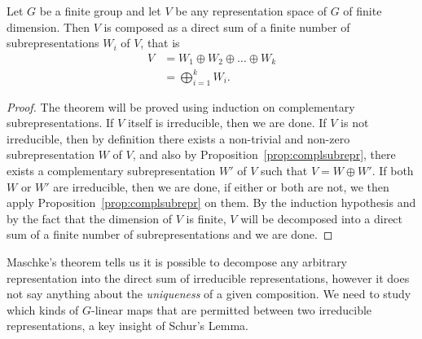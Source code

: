 \begin{theorem}\label{thm:maschkes}
	Let $G$ be a finite group and let $V$ be any representation space of $G$ of finite dimension. Then $V$ is composed as a direct sum of a finite number of subrepresentations $W_i$ of $V$, that is
	\begin{align*}
		V &= W_1 \oplus W_2 \oplus \dots \oplus W_k \\
		&= \bigoplus_{i=1}^k W_i.
	\end{align*}
\end{theorem}
\begin{proof}
	The theorem will be proved using induction on complementary subrepresentations. If $V$ itself is irreducible, then we are done. If $V$ is not irreducible, then by definition there exists a non-trivial and non-zero subrepresentation $W$ of $V$, and also by Proposition~\ref{prop:complsubrepr}, there exists a complementary subrepresentation $W'$ of $V$ such that $V = W \oplus W'$. If both $W$ or $W'$ are irreducible, then we are done, if either or both are not, we then apply Proposition~\ref{prop:complsubrepr} on them. By the induction hypothesis and by the fact that the dimension of $V$ is finite, $V$ will be decomposed into a direct sum of a finite number of subrepresentations and we are done.
\end{proof}


Maschke's theorem tells us it is possible to decompose any arbitrary representation into the direct sum of irreducible representations, however it does not say anything about the \textit{uniqueness} of a given composition. We need to study which kinds of $G$-linear maps that are permitted between two irreducible representations, a key insight of Schur's Lemma.


